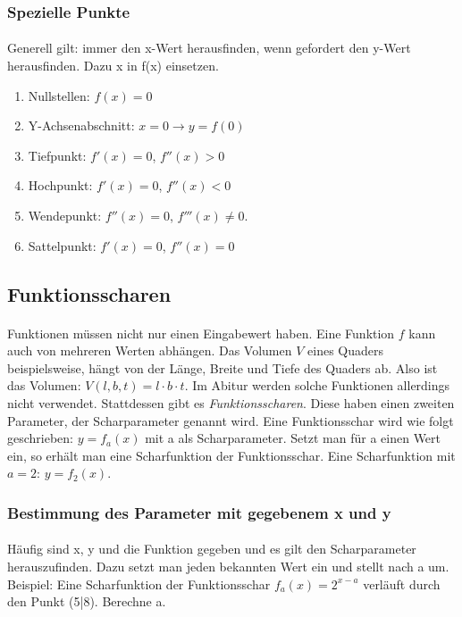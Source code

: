 \documentclass{article}
\begin{document}
	\subsubsection{Spezielle Punkte}\label{Spezielle Punkte}
		\paragraph{}
			Generell gilt: immer den x-Wert herausfinden, wenn gefordert den y-Wert herausfinden. Dazu x in f(x) einsetzen.

			\begin{enumerate}
			    \item Nullstellen: $f(x)=0$
			    \item Y-Achsenabschnitt: $x=0 \rightarrow y=f(0)$
			    \item Tiefpunkt: $f'(x)=0$, $f''(x)>0$
			    \item Hochpunkt: $f'(x)=0$, $f''(x)<0$
			    \item Wendepunkt: $f''(x)=0$, $f'''(x)\neq 0$.
			    \item Sattelpunkt: $f'(x)=0$, $f''(x)=0$
			\end{enumerate}

	\subsection{Funktionsscharen}
		\paragraph{}
			
			Funktionen müssen nicht nur einen Eingabewert haben. Eine Funktion $f$ kann auch von mehreren Werten abhängen.
			Das Volumen $V$ eines Quaders beispielsweise, hängt von der Länge, Breite und Tiefe des Quaders ab.
			Also ist das Volumen: $V(l,b,t)=l \cdot b \cdot t$. Im Abitur werden solche Funktionen allerdings nicht verwendet.
			Stattdessen gibt es \emph{Funktionsscharen}. Diese haben einen zweiten Parameter, der Scharparameter genannt wird.
			Eine Funktionsschar wird wie folgt geschrieben: $y=f_a(x)$ mit a als Scharparameter. Setzt man für a einen Wert ein,
			so erhält man eine Scharfunktion der Funktionsschar. Eine Scharfunktion mit $a=2$: $y=f_2(x)$.

	\subsubsection{Bestimmung des Parameter mit gegebenem x und y}
		\paragraph{}
			Häufig sind x, y und die Funktion gegeben und es gilt den Scharparameter herauszufinden. Dazu setzt man jeden bekannten
			Wert ein und stellt nach a um. Beispiel: Eine Scharfunktion der Funktionsschar $f_a(x)=2^{x-a}$
			verläuft durch den Punkt (5|8). Berechne a.
			
\end{document}
